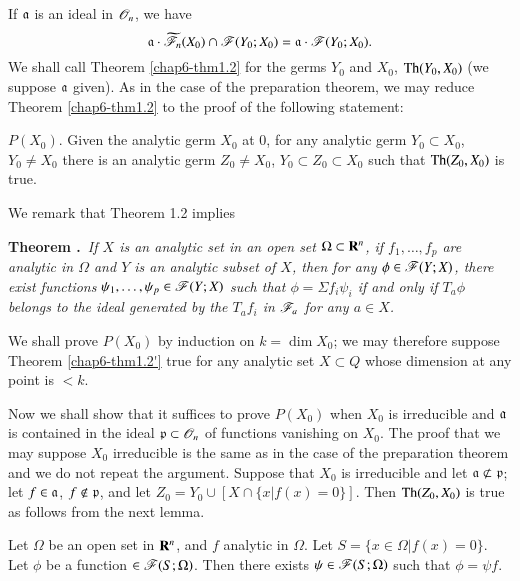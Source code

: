 \begin{theorem}\label{chap6-thm1.2}
If $\mathfrak{a}$ is an ideal in $\mathscr{O}_{n}$, we have
$$
\mathfrak{a}\cdot \widetilde{\mathscr{F}}_{n}(X_{0})\cap \mathscr{F}(Y_{0};X_{0})=\mathfrak{a}\cdot \mathscr{F}(Y_{0};X_{0}).
$$
We shall call Theorem \ref{chap6-thm1.2} for the germs $Y_{0}$ and $X_{0}$, $\operatorname{Th}(Y_{0},X_{0})$ (we suppose $\mathfrak{a}$ given). As in the case of the preparation theorem, we may reduce Theorem \ref{chap6-thm1.2} to the proof of the following statement:

$P(X_{0})$. Given the analytic germ $X_{0}$ at $0$, for any analytic germ $Y_{0}\subset X_{0}$, $Y_{0}\neq X_{0}$ there is an analytic germ $Z_{0}\neq X_{0}$, $Y_{0}\subset Z_{0}\subset X_{0}$ such that $\operatorname{Th}(Z_{0},X_{0})$ is true.
\end{theorem}

We remark that Theorem 1.2 implies

\medskip
\noindent
{\bf Theorem .\label{chap6-thm1.2'}}~{\em If $X$ is an analytic set in an open set $\Omega\subset \mathbf{R}^{n}$, if $f_{1},\ldots,f_{p}$ are analytic in $\Omega$ and $Y$ is an analytic subset of $X$, then for any $\phi\in \mathscr{F}(Y;X)$, there exist functions $\psi_{1},\ldots,\psi_{p}\in \mathscr{F}(Y;X)$ such that $\phi=\Sigma f_{i}\psi_{i}$ if and only if $T_{a}\phi$ belongs to the ideal generated by the $T_{a}f_{i}$ in $\mathscr{F}_{a}$ for any $a\in X$.}
\smallskip

We shall prove $P(X_{0})$ by induction on $k=\dim X_{0}$; we may therefore suppose Theorem \ref{chap6-thm1.2'} true for any analytic set $X\subset Q$ whose dimension at any point is $<k$.

Now we shall show that it suffices to prove $P(X_{0})$ when $X_{0}$ is irreducible and $\mathfrak{a}$ is contained in the ideal $\mathfrak{p}\subset\mathscr{O}_{n}$ of functions vanishing on $X_{0}$. The proof that we may suppose $X_{0}$ irreducible is the same as in the case of the preparation theorem and we do not repeat the argument. Suppose that $X_{0}$ is irreducible and let $\fraka\nsubset \frakp$; let $f\in \mathfrak{a}$, $f\not\in \mathfrak{p}$, and let $Z_{0}=Y_{0}\cup [X\cap \{x|f(x)=0\}]$. Then $\operatorname{Th}(Z_{0},X_{0})$ is true as follows from the next lemma.

\begin{lemma}\label{chap6-lem1.3}
Let $\Omega$ be an open set in $\mathbf{R}^{n}$, and $f$ analytic in $\Omega$. Let $S=\{x\in\Omega|f(x)=0\}$. Let $\phi$ be a function $\in\mathscr{F}(S;\Omega)$. Then there exists $\psi\in \mathscr{F}(S;\Omega)$ such that $\phi=\psi f$.
\end{lemma}

